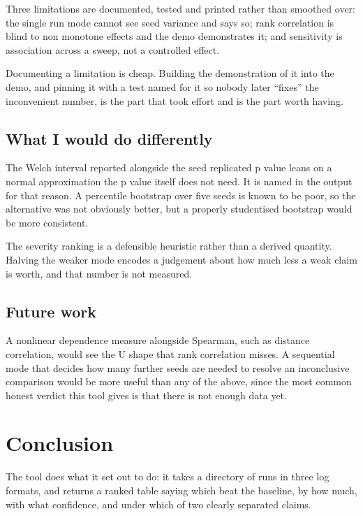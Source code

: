 \documentclass[11pt,a4paper]{report}
\begin{document}
Three limitations are documented, tested and printed rather than smoothed over:
the single run mode cannot see seed variance and says so; rank correlation is
blind to non monotone effects and the demo demonstrates it; and sensitivity is
association across a sweep, not a controlled effect.

Documenting a limitation is cheap. Building the demonstration of it into the
demo, and pinning it with a test named for it so nobody later ``fixes'' the
inconvenient number, is the part that took effort and is the part worth having.

\section{What I would do differently}

The Welch interval reported alongside the seed replicated p value leans on a
normal approximation the p value itself does not need. It is named in the output
for that reason. A percentile bootstrap over five seeds is known to be poor, so
the alternative was not obviously better, but a properly studentised bootstrap
would be more consistent.

The severity ranking is a defensible heuristic rather than a derived quantity.
Halving the weaker mode encodes a judgement about how much less a weak claim is
worth, and that number is not measured.

\section{Future work}

A nonlinear dependence measure alongside Spearman, such as distance correlation,
would see the U shape that rank correlation misses. A sequential mode that
decides how many further seeds are needed to resolve an inconclusive comparison
would be more useful than any of the above, since the most common honest verdict
this tool gives is that there is not enough data yet.

\chapter{Conclusion}
\label{ch:conclusion}

The tool does what it set out to do: it takes a directory of runs in three log
formats, and returns a ranked table saying which beat the baseline, by how much,
with what confidence, and under which of two clearly separated claims.
\end{document}
